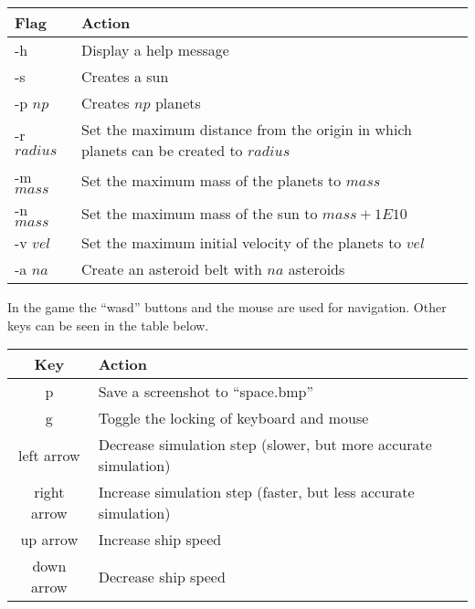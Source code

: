 \documentclass[a4paper,12pt]{article} \usepackage{graphicx}
\begin{document}
\begin{center}
        \begin{tabular}{| l | p{9cm} |}
                \hline
                \textbf{Flag} & \textbf{Action} \\
                \hline
                -h & Display a help message \\
                -s & Creates a sun \\
                -p $np$ & Creates $np$ planets \\
                -r $radius$ & Set the maximum distance from the origin in which planets can be created to $radius$\\
                -m $mass$ & Set the maximum mass of the planets to $mass$\\
                -n $mass$ & Set the maximum mass of the sun to $mass + 1E10$ \\
                -v $vel$ & Set the maximum initial velocity of the planets to $vel$ \\
                -a $na$ & Create an asteroid belt with $na$ asteroids \\
                \hline
        \end{tabular}
\end{center}

In the game the ``wasd'' buttons and the mouse are used for navigation.
Other keys can be seen in the table below.
\begin{center}
        \begin{tabular}{|c|l|}
                \hline
                \textbf{Key} & \textbf{Action} \\
                \hline
                p & Save a screenshot to ``space.bmp'' \\
                g & Toggle the locking of keyboard and mouse \\
                left arrow & Decrease simulation step (slower, but more accurate simulation) \\
                right arrow & Increase simulation step (faster, but less accurate simulation) \\
                up arrow & Increase ship speed \\
                down arrow & Decrease ship speed \\
                \hline
        \end{tabular}
\end{center}
\end{document}
